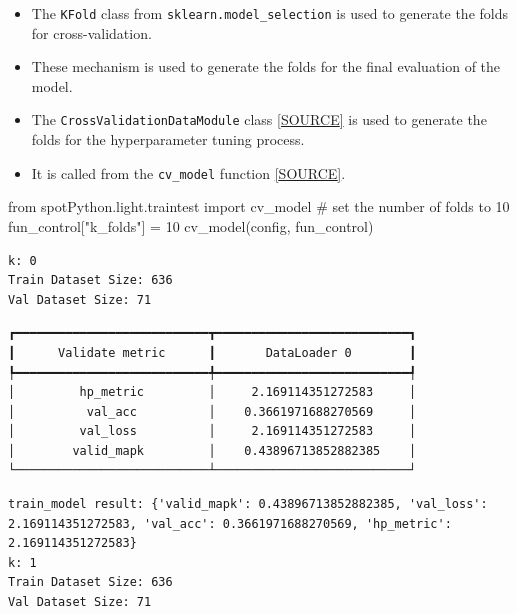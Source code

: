 \documentclass[
  letterpaper,
  DIV=11,
  numbers=noendperiod]{scrreprt}
\newenvironment{Shaded}{\begin{snugshade}}{\end{snugshade}}
\newcommand{\CommentTok}[1]{\textcolor[rgb]{0.37,0.37,0.37}{#1}}
\newcommand{\DecValTok}[1]{\textcolor[rgb]{0.68,0.00,0.00}{#1}}
\newcommand{\ImportTok}[1]{\textcolor[rgb]{0.00,0.46,0.62}{#1}}
\newcommand{\NormalTok}[1]{\textcolor[rgb]{0.00,0.23,0.31}{#1}}
\newcommand{\OperatorTok}[1]{\textcolor[rgb]{0.37,0.37,0.37}{#1}}
\newcommand{\StringTok}[1]{\textcolor[rgb]{0.13,0.47,0.30}{#1}}
\providecommand{\tightlist}{%
  \setlength{\itemsep}{0pt}\setlength{\parskip}{0pt}}\usepackage{longtable,booktabs,array}
\begin{document}
\begin{itemize}
\tightlist
\item
  The \texttt{KFold} class from \texttt{sklearn.model\_selection} is
  used to generate the folds for cross-validation.
\item
  These mechanism is used to generate the folds for the final evaluation
  of the model.
\item
  The \texttt{CrossValidationDataModule} class
  \href{https://github.com/sequential-parameter-optimization/spotPython/blob/main/src/spotPython/light/crossvalidationdatamodule.py}{{[}SOURCE{]}}
  is used to generate the folds for the hyperparameter tuning process.
\item
  It is called from the \texttt{cv\_model} function
  \href{https://github.com/sequential-parameter-optimization/spotPython/blob/main/src/spotPython/light/traintest.py}{{[}SOURCE{]}}.
\end{itemize}

\begin{Shaded}
\begin{Highlighting}[]
\ImportTok{from}\NormalTok{ spotPython.light.traintest }\ImportTok{import}\NormalTok{ cv\_model}
\CommentTok{\# set the number of folds to 10}
\NormalTok{fun\_control[}\StringTok{"k\_folds"}\NormalTok{] }\OperatorTok{=} \DecValTok{10}
\NormalTok{cv\_model(config, fun\_control)}
\end{Highlighting}
\end{Shaded}

\begin{verbatim}
k: 0
Train Dataset Size: 636
Val Dataset Size: 71
\end{verbatim}

\begin{verbatim}
┏━━━━━━━━━━━━━━━━━━━━━━━━━━━┳━━━━━━━━━━━━━━━━━━━━━━━━━━━┓
┃      Validate metric      ┃       DataLoader 0        ┃
┡━━━━━━━━━━━━━━━━━━━━━━━━━━━╇━━━━━━━━━━━━━━━━━━━━━━━━━━━┩
│         hp_metric         │     2.169114351272583     │
│          val_acc          │    0.3661971688270569     │
│         val_loss          │     2.169114351272583     │
│        valid_mapk         │    0.43896713852882385    │
└───────────────────────────┴───────────────────────────┘
\end{verbatim}

\begin{verbatim}
train_model result: {'valid_mapk': 0.43896713852882385, 'val_loss': 2.169114351272583, 'val_acc': 0.3661971688270569, 'hp_metric': 2.169114351272583}
k: 1
Train Dataset Size: 636
Val Dataset Size: 71
\end{verbatim}
\end{document}
